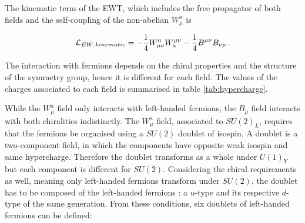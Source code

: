 The kinematic term of the EWT, which includes the free propagator of both fields and the self-coupling of the non-abelian $W_{\mu}^a$ is

\begin{equation}
    \Lagr_{EW,\,kinematic} = -\frac{1}{4}W_{\mu\nu}^a W^{\mu\nu}_a - \frac{1}{4} B^{\mu\nu}B_{\nu\mu} \mend
\end{equation}

The interaction with fermions depends on the chiral properties and the structure of the symmetry group, hence it is different for each field. The values of the charges associated to each field is summarised in table \ref{tab:hypercharge}.

\begin{table}[h]
    \centering
    \caption{Values of the electroweak charges (weak isospin $I_3$, hypercharge $Y$ and electromagnetic charge $Q$) for the fermions, according to their type and chirality.}
    \label{tab:hypercharge}
\end{table}

While the $W_{\mu}^a$ field only interacts with left-handed fermions, the $B_{\mu}$ field interacts with both chiralities indistinctly.
The $W_{\mu}^a$ field, associated to $SU(2)_L$, requires that the fermions be organised using a $SU(2)$ doublet of isospin. A doublet is a two-component field, in which the components have opposite weak isospin and same hypercharge. Therefore the doublet transforms as a whole under $U(1)_Y$ but each component is different for $SU(2)$. Considering the chiral requirements as well, meaning only left-handed fermions transform under $SU(2)$, the doublet has to be composed of the left-handed fermions : a $u$-type and its respective $d$-type of the same generation. From these conditions, six doublets of left-handed fermions can be defined:

